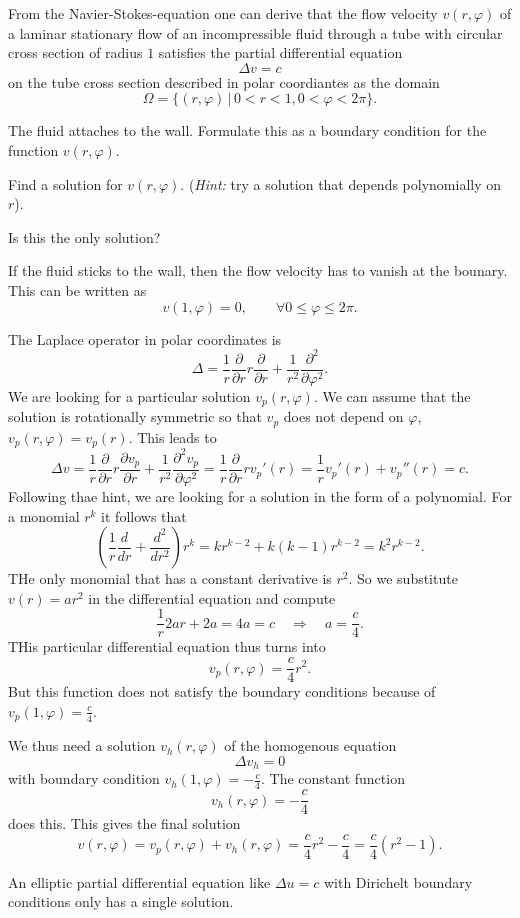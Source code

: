 From the Navier-Stokes-equation one can derive that the
flow velocity $v(r,\varphi)$ of a laminar stationary flow of an
incompressible fluid through a tube with circular cross section
of radius $1$ satisfies the partial differential equation
\[
\Delta v=c
\]
on the tube cross section described in polar coordiantes as the domain
\[
\Omega = \{ (r,\varphi)\,|\,0 < r < 1,0 < \varphi < 2\pi\}.
\]
\begin{teilaufgaben}
\item
The fluid attaches to the wall.
Formulate this as a boundary condition for the function $v(r,\varphi)$.
\item
Find a solution for $v(r,\varphi)$.
({\it Hint:} try a solution that depends polynomially on $r$).
\item
Is this the only solution?
\end{teilaufgaben}

\begin{loesung}
\begin{teilaufgaben}
\item
If the fluid sticks to the wall, then the flow velocity has to 
vanish at the bounary.
This can be written as
\[
v(1,\varphi)=0,\qquad\forall 0\le \varphi\le 2\pi.
\]
\item
The Laplace operator in polar coordinates is
\[
\Delta
=
\frac1r\frac{\partial}{\partial r}r\frac{\partial}{\partial r}
+\frac1{r^2}\frac{\partial^2}{\partial\varphi^2}.
\]
We are looking for a particular solution $v_p(r,\varphi)$.
We can assume that the solution is rotationally symmetric so that
$v_p$ does not depend on $\varphi$, 
$v_p(r,\varphi)=v_p(r)$.
This leads to
\[
\Delta v=
\frac1r\frac{\partial}{\partial r}r
\frac{\partial v_p}{\partial r}
+\frac1{r^2}\frac{\partial^2v_p}{\partial\varphi^2}
=
\frac1r\frac{\partial}{\partial r}rv_p'(r)
=
\frac1rv_p'(r)+v_p''(r)=c.
\]
Following thae hint, we are looking for a solution in the form of a
polynomial.
For a monomial $r^k$ it follows that
\[
\left(\frac1r\frac{d}{dr}+\frac{d^2}{dr^2}\right)r^k
=kr^{k-2}+k(k-1)r^{k-2}
=k^2 r^{k-2}.
\]
THe only monomial that has a constant derivative is $r^2$.
So we substitute $v(r)=ar^2$ in the differential equation and compute
\[
\frac1r2ar+2a
=
4a
=c
\quad
\Rightarrow
\quad
a=\frac{c}{4}.
\]
THis particular differential equation thus turns into
\[
v_p(r,\varphi)=\frac{c}{4}r^2.
\]
But this function does not satisfy the boundary conditions because of
$v_p(1,\varphi)=\frac{c}{4}$.

We thus need a solution $v_h(r,\varphi)$ of the homogenous equation
\[
\Delta v_h=0
\]
with boundary condition $v_h(1,\varphi)=-\frac{c}{4}$.
The constant function
\[
v_h(r,\varphi)=-\frac{c}{4}
\]
does this.
This gives the final solution
\[
v(r,\varphi)=v_p(r,\varphi)+v_h(r,\varphi)=\frac{c}{4}r^2 -\frac{c}{4}=
\frac{c}{4}(r^2-1).
\]
\item
An elliptic partial differential equation like
$\Delta u=c$ with Dirichelt boundary conditions only has a single 
solution.
\qedhere
\end{teilaufgaben}
\end{loesung}
